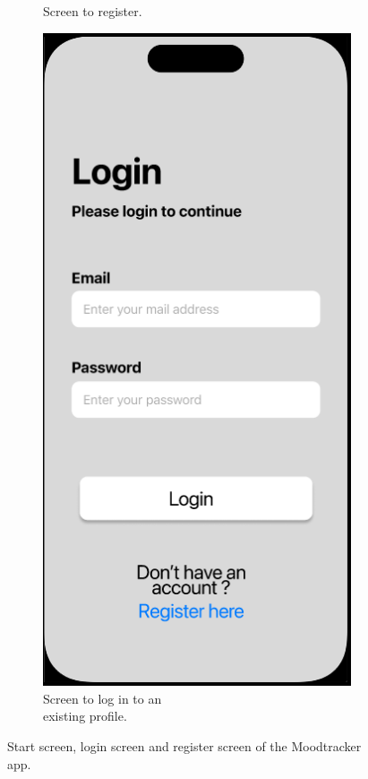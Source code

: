 \documentclass[11pt]{article}
\begin{document}
\begin{figure}[h!]
\begin{subfigure}[b]{0.3\textwidth}
         \caption{Screen to register.\\ \mbox{}}
         \label{fig:register}
     \end{subfigure}
          \hfill
     \begin{subfigure}[b]{0.3\textwidth}
         \centering
         \includegraphics[width=\textwidth]{figures/login.PNG}
         \caption{Screen to log in to an\\ existing profile.}
         \label{fig:login}
     \end{subfigure}
        \caption{Start screen, login screen and register screen of the Moodtracker app.}
\end{figure}
\end{document}
